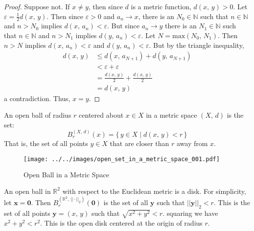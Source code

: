 \documentclass{article}
\theoremstyle{plain}
\theoremstyle{normal}
\newenvironment{example}{%
    \pushQED{\qed}\renewcommand{\qedsymbol}{$\blacksquare$}\examplex%
}{%
    \popQED\endexamplex%
}
\newenvironment{definition}{%
    \pushQED{\qed}\renewcommand{\qedsymbol}{$\blacksquare$}\definitionx%
}{%
    \popQED\enddefinitionx%
}
\begin{document}
        \begin{proof}
            Suppose not. If $x\ne{y}$, then since $d$ is a metric function,
            $d(x,\,y)>0$. Let $\varepsilon=\frac{1}{2}d(x,\,y)$. Then since
            $\varepsilon>0$ and $a_{n}\rightarrow{x}$, there is an
            $N_{0}\in\mathbb{N}$ such that $n\in\mathbb{N}$ and $n>N_{0}$
            implies $d(x,\,a_{n})<\varepsilon$. But since $a_{n}\rightarrow{y}$
            there is an $N_{1}\in\mathbb{N}$ such that $n\in\mathbb{N}$ and
            $n>N_{1}$ implies $d(y,\,a_{n})<\varepsilon$. Let
            $N=\textrm{max}(N_{0},\,N_{1})$. Then $n>N$ implies
            $d(x,\,a_{n})<\varepsilon$ and $d(y,\,a_{n})<\varepsilon$. But by
            the triangle inequality,
            \begin{align}
                d(x,\,y)&\leq{d}(x,\,a_{N+1})+d(y,\,a_{N+1})\\
                &<\varepsilon+\varepsilon\\
                &=\frac{d(x,\,y)}{2}+\frac{d(x,\,y)}{2}\\
                &=d(x,\,y)
            \end{align}
            a contradiction. Thus, $x=y$.
        \end{proof}
        \begin{definition}[\textbf{Open Ball}]
            An open ball of radius $r$ centered about $x\in{X}$ in a metric
            space $(X,\,d)$ is the set:
            \begin{equation}
                B_{r}^{(X,\,d)}(x)=\{\,y\in{X}\;|\;d(x,\,y)<r\,\}
            \end{equation}
            That is, the set of all points $y\in{X}$ that are closer than
            $r$ away from $x$.
        \end{definition}
        \begin{figure}
            \centering
            \texttt{[image: ../../images/open\_set\_in\_a\_metric\_space\_001.pdf]}
            \caption{Open Ball in a Metric Space}
            \label{fig:open_set_in_a_metric_space_001}
        \end{figure}
        \begin{example}
            An open ball in $\mathbb{R}^{2}$ with respect to the Euclidean
            metric is a disk. For simplicity, let $\mathbf{x}=\mathbf{0}$. Then
            $B_{r}^{(\mathbb{R}^{2},\,||\cdot||_{2})}(\mathbf{0})$ is
            the set of all $\mathbf{y}$ such that
            $||\mathbf{y}||_{2}<r$. This is the set of all points
            $\mathbf{y}=(x,\,y)$ such that $\sqrt{x^{2}+y^{2}}<r$. squaring
            we have $x^{2}+y^{2}<r^{2}$. This is the open disk centered at the
            origin of radius $r$.
        \end{example}
\end{document}
